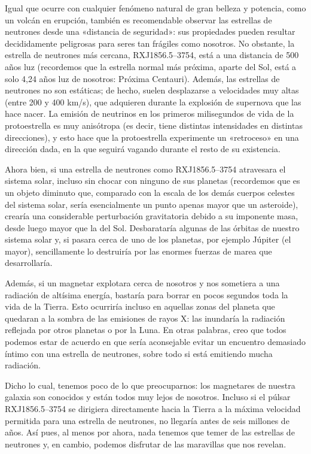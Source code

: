 Igual que ocurre con cualquier fenómeno natural de gran belleza y potencia, como un volcán en erupción, también es recomendable observar las estrellas de neutrones desde una «distancia de seguridad»: sus propiedades pueden resultar decididamente peligrosas para seres tan frágiles como nosotros. No obstante, la estrella de neutrones más cercana, RXJ1856.5--3754, está a una distancia de 500 años luz (recordemos que la estrella normal más próxima, aparte del Sol, está a solo 4,24 años luz de nosotros: Próxima Centauri). Además, las estrellas de neutrones no son estáticas; de hecho, suelen desplazarse a velocidades muy altas (entre 200 y 400 km/s), que adquieren durante la explosión de supernova que las hace nacer. La emisión de neutrinos en los primeros milisegundos de vida de la protoestrella es muy anisótropa (es decir, tiene distintas intensidades en distintas direcciones), y esto hace que la protoestrella experimente un «retroceso» en una dirección dada, en la que seguirá vagando durante el resto de su existencia.

Ahora bien, si una estrella de neutrones como RXJ1856.5--3754 atravesara el sistema solar, incluso sin chocar con ninguno de sus planetas (recordemos que es un objeto diminuto que, comparado con la escala de los demás cuerpos celestes del sistema solar, sería esencialmente un punto apenas mayor que un asteroide), crearía una considerable perturbación gravitatoria debido a su imponente masa, desde luego mayor que la del Sol. Desbarataría algunas de las órbitas de nuestro sistema solar y, si pasara cerca de uno de los planetas, por ejemplo Júpiter (el mayor), sencillamente lo destruiría por las enormes fuerzas de marea que desarrollaría.

Además, si un magnetar explotara cerca de nosotros y nos sometiera a una radiación de altísima energía, bastaría para borrar en pocos segundos toda la vida de la Tierra. Esto ocurriría incluso en aquellas zonas del planeta que quedaran a la sombra de las emisiones de rayos X: las inundaría la radiación reflejada por otros planetas o por la Luna. En otras palabras, creo que todos podemos estar de acuerdo en que sería aconsejable evitar un encuentro demasiado íntimo con una estrella de neutrones, sobre todo si está emitiendo mucha radiación.

Dicho lo cual, tenemos poco de lo que preocuparnos: los magnetares de nuestra galaxia son conocidos y están todos muy lejos de nosotros. Incluso si el púlsar RXJ1856.5--3754 se dirigiera directamente hacia la Tierra a la máxima velocidad permitida para una estrella de neutrones, no llegaría antes de seis millones de años. Así pues, al menos por ahora, nada tenemos que temer de las estrellas de neutrones y, en cambio, podemos disfrutar de las maravillas que nos revelan.
